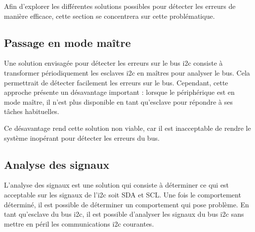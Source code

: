 Afin d'explorer les différentes solutions possibles pour détecter les erreurs de manière efficace, cette section se concentrera sur cette problématique.

\subsection{Passage en mode maître}

Une solution envisagée pour détecter les erreurs sur le bus \gls{i2c} consiste à transformer périodiquement les esclaves \gls{i2c} en maîtres pour analyser le bus.
Cela permettrait de détecter facilement les erreurs sur le bus.
Cependant, cette approche présente un désavantage important : lorsque le périphérique est en mode maître, il n'est plus disponible en tant qu'esclave pour répondre à ses tâches habituelles.

Ce désavantage rend cette solution non viable, car il est inacceptable de rendre le système inopérant pour détecter les erreurs du bus.

\subsection{Analyse des signaux}

L'analyse des signaux est une solution qui consiste à déterminer ce qui est acceptable sur les signaux de l'\gls{i2c} soit SDA et SCL. Une fois le comportement déterminé, il est possible de déterminer un comportement qui pose problème. En tant qu'esclave du bus \gls{i2c}, il est possible d'analyser les signaux du bus \gls{i2c} sans mettre en péril les communications \gls{i2c} courantes.